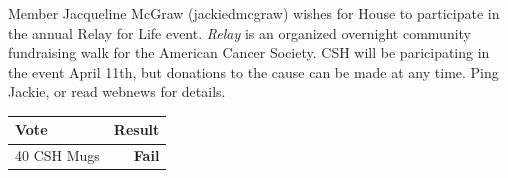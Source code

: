 \documentclass[10pt]{article} %
\begin{document}
\begin{minipage}[t]{.30\linewidth}
\begin{mdframed}[style=sidebar,frametitle={}]
Member Jacqueline McGraw (jackiedmcgraw) wishes for House to participate in the annual Relay for Life event. \textit{Relay} is an organized overnight community fundraising walk for the American Cancer Society. CSH will be paricipating in the event April 11th, but donations to the cause can be made at any time. Ping Jackie, or read webnews for details.


\begin{tabular}{lr}

Vote & Result \\
\midrule
40 CSH Mugs & \textbf{Fail} \\
\bottomrule
\end{tabular}


\end{mdframed}
\end{minipage}\hfill %
%
%
\end{document}
